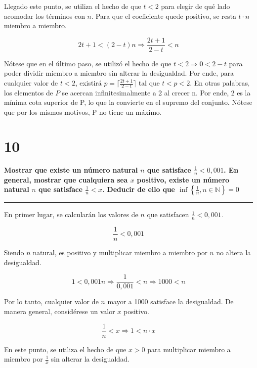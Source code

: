 \documentclass{article}
\newcommand{\sectionx}[1]{\section*{#1}\label{sec:#1}\addcontentsline{toc}{section}{\nameref{sec:#1}}}
\begin{document}
Llegado este punto, se utiliza el hecho de que $ t < 2 $ para elegir de qué lado acomodar los términos con $ n $. Para que el coeficiente quede positivo, se resta $ t \cdot n $ miembro a miembro.

\begin{equation}
2t + 1 < (2-t) n \Rightarrow \frac{2t+1}{2-t} < n
\end{equation}

Nótese que en el último paso, se utilizó el hecho de que $ t < 2 \Rightarrow 0 < 2-t $ para poder dividir miembro a miembro sin alterar la desigualdad. Por ende, para cualquier valor de $ t < 2$, existirá $ p = \lceil \frac{2t+1}{2-t} \rceil $ tal que $ t < p < 2$. En otras palabras, los elementos de $ P $ se acercan infinitesimalmente a 2 al crecer n. Por ende, 2 es la mínima cota superior de P, lo que la convierte en el supremo del conjunto. Nótese que por los mismos motivos, P no tiene un máximo.

\sectionx{10}

\textbf{Mostrar que existe un número natural $ n $ que satisface $ \frac{1}{n} < 0,001 $. En general, mostrar que cualquiera sea $ x $ positivo, existe un número natural $ n $ que satisface $ \frac{1}{n} < x $. Deducir de ello que $ \mathop{\text{inf}}\left\{ \frac{1}{n}, n \in \mathbb{N} \right\} = 0$}

\vspace{1em}
\hrule
\vspace{1em}

En primer lugar, se calcularán los valores de $ n $ que satisfacen $ \frac{1}{n} < 0,001 $.

\begin{equation}
\frac{1}{n} < 0,001
\end{equation}

Siendo $ n $ natural, es positivo y multiplicar miembro a miembro por $ n $ no altera la desigualdad.

\begin{equation}
1 < 0,001 n \Rightarrow \frac{1}{0,001} < n \Rightarrow 1000 < n
\end{equation}

Por lo tanto, cualquier valor de $ n $ mayor a 1000 satisface la desigualdad. De manera general, considérese un valor $ x $ positivo.

\begin{equation}
\frac{1}{n} < x \Rightarrow 1 < n \cdot x
\end{equation}

En este punto, se utiliza el hecho de que $ x > 0 $ para multiplicar miembro a miembro por $ \frac{1}{x} $ sin alterar la desigualdad.
\end{document}
